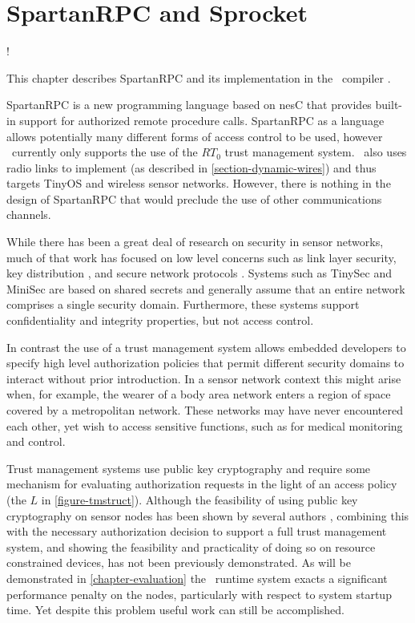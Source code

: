 
\chapter{SpartanRPC and Sprocket}
\label{chapter-spartanrpc-sprocket}

\lstset{language=nesC}
\lstMakeShortInline[basicstyle=\ttfamily]!

This chapter describes SpartanRPC \cite{chapin-skalka-SpartanRPC,chapin-skalka-SpartanRPCTR}
and its implementation in the \Sprocket\ compiler \cite{sprocket}.

SpartanRPC is a new programming language based on nesC that provides built-in support for
authorized remote procedure calls. SpartanRPC as a language allows potentially many different
forms of access control to be used, however \Sprocket\ currently only supports the use of the
$RT_0$ trust management system. \Sprocket\ also uses radio links to implement  (as described in \autoref{section-dynamic-wires}) and thus targets TinyOS and wireless
sensor networks. However, there is nothing in the design of SpartanRPC that would preclude the
use of other communications channels.

While there has been a great deal of research on security in sensor networks, much of that work
has focused on low level concerns such as link layer security, key distribution
\cite{camtepe-bulent-05}, and secure network protocols \cite{1049776,fouladgar-3tls-2006}.
Systems such as TinySec \cite{karlog-tinysec-2004} and MiniSec \cite{luk-minisec-2007} are based
on shared secrets and generally assume that an entire network comprises a single security
domain. Furthermore, these systems support confidentiality and integrity properties, but not
access control.

In contrast the use of a trust management system allows embedded developers to specify high
level authorization policies that permit different security domains to interact without prior
introduction. In a sensor network context this might arise when, for example, the wearer of a
body area network enters a region of space covered by a metropolitan network. These networks may
have never encountered each other, yet wish to access sensitive functions, such as for
medical monitoring and control.

Trust management systems use public key cryptography and require some mechanism for evaluating
authorization requests in the light of an access policy (the $L$ in \autoref{figure-tmstruct}).
Although the feasibility of using public key cryptography on sensor nodes has been shown by
several authors
\cite{1049776,Malan:2008:IPI:1387663.1387668,bertoni-2006,kumar-2006,4604657,Liu-Peng-TinyECC-2008,Szczechowiak:2008:NTL:1786014.1786040},
combining this with the necessary authorization decision to support a full trust management
system, and showing the feasibility and practicality of doing so on resource constrained
devices, has not been previously demonstrated. As will be demonstrated in \autoref{chapter-evaluation}
the \Sprocket\ runtime system exacts a significant performance penalty on the nodes,
particularly with respect to system startup time. Yet despite this problem useful work can still
be accomplished.

